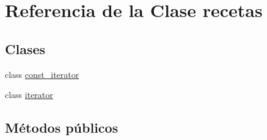 \hypertarget{classrecetas}{}\section{Referencia de la Clase recetas}
\label{classrecetas}
\subsection*{Clases}
\begin{DoxyCompactItemize}
\item 
class \hyperlink{classrecetas_1_1const__iterator}{const\+\_\+iterator}
\item 
class \hyperlink{classrecetas_1_1iterator}{iterator}
\end{DoxyCompactItemize}
\subsection*{Métodos públicos}
